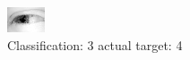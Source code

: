 \begin{figure}[h!]
\begin{center}
\includegraphics[width=0.60\columnwidth]{figures/ID2543_class_3_target_4.png}
\end{center}
\caption{ Classification: 3 actual target: 4}
\label{fig:ID2543_class_3_target_4}
\end{figure}
